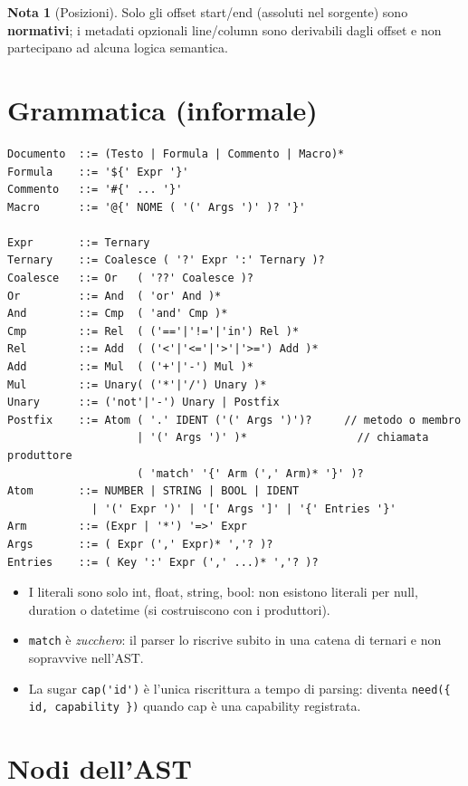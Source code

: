\documentclass[11pt,a4paper]{book}
\let\code\lstinline
\newcommand{\ic}[1]{{\ttfamily #1}}
\theoremstyle{definition}
\newtheorem*{nota}{Nota}
\begin{document}
{{{{\begin{nota}[Posizioni]
Solo gli offset \ic{start}/\ic{end} (assoluti nel sorgente) sono \textbf{normativi};
i metadati opzionali \ic{line}/\ic{column} sono derivabili dagli offset e non
partecipano ad alcuna logica semantica.
\end{nota}

\section{Grammatica (informale)}

\begin{lstlisting}
Documento  ::= (Testo | Formula | Commento | Macro)*
Formula    ::= '${' Expr '}'
Commento   ::= '#{' ... '}'
Macro      ::= '@{' NOME ( '(' Args ')' )? '}'

Expr       ::= Ternary
Ternary    ::= Coalesce ( '?' Expr ':' Ternary )?
Coalesce   ::= Or   ( '??' Coalesce )?
Or         ::= And  ( 'or' And )*
And        ::= Cmp  ( 'and' Cmp )*
Cmp        ::= Rel  ( ('=='|'!='|'in') Rel )*
Rel        ::= Add  ( ('<'|'<='|'>'|'>=') Add )*
Add        ::= Mul  ( ('+'|'-') Mul )*
Mul        ::= Unary( ('*'|'/') Unary )*
Unary      ::= ('not'|'-') Unary | Postfix
Postfix    ::= Atom ( '.' IDENT ('(' Args ')')?     // metodo o membro
                    | '(' Args ')' )*                 // chiamata produttore
                    ( 'match' '{' Arm (',' Arm)* '}' )?
Atom       ::= NUMBER | STRING | BOOL | IDENT
             | '(' Expr ')' | '[' Args ']' | '{' Entries '}'
Arm        ::= (Expr | '*') '=>' Expr
Args       ::= ( Expr (',' Expr)* ','? )?
Entries    ::= ( Key ':' Expr (',' ...)* ','? )?
\end{lstlisting}

\begin{itemize}
  \item I literali sono solo \ic{int}, \ic{float}, \ic{string}, \ic{bool}: non
    esistono literali per \ic{null}, \ic{duration} o \ic{datetime} (si costruiscono
    con i produttori).
  \item \code|match| è \emph{zucchero}: il parser lo riscrive subito in una catena
    di ternari e non sopravvive nell'AST.
  \item La sugar \code|cap('id')| è l'unica riscrittura a tempo di parsing: diventa
    \code|need({ id, capability })| quando \ic{cap} è una capability registrata.
\end{itemize}

\section{Nodi dell'AST}

}}}}
\end{document}
